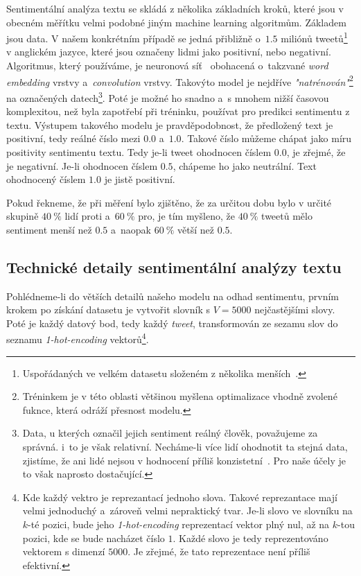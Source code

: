 \documentclass[12pt, a4paper]{article}
\numberwithin{equation}{section} 	%
\begin{document}
Sentimentální analýza textu se skládá z několika základních kroků, které jsou v obecném měřítku velmi podobné jiným machine learning algoritmům. Základem jsou data. V našem konkrétním případě se jedná přibližně o~$1.5$ miliónů tweetů\footnote{Uspořádaných ve velkém datasetu složeném z několika menších~\cite{TwitterData1, TwitterData2}.} v anglickém jazyce, které jsou označeny lidmi jako positivní, nebo negativní. Algoritmus, který používáme, je neuronová síť~\cite{TwitterSentAnalysis} obohacená o~takzvané \textit{word embedding} vrstvy a~\textit{convolution} vrstvy. Takovýto model je nejdříve \textit{"natrénován"}\footnote{Tréninkem je v této oblasti většinou myšlena optimalizace vhodně zvolené fuknce, která odráží přesnost modelu.} na označených datech\footnote{Data, u kterých označil jejich sentiment reálný člověk, považujeme za správná. i~to je však relativní. Necháme-li více lidí ohodnotit ta stejná data, zjistíme, že ani lidé nejsou v hodnocení příliš konzistetní~\cite{HumanVsMachineLearning}. Pro naše účely je to však naprosto dostačující.}. Poté je možné ho snadno a~s mnohem nižší časovou komplexitou, než byla zapotřebí při tréninku, používat pro predikci sentimentu z textu. Výstupem takového modelu je pravděpodobnost, že předložený text je positivní, tedy reálné číslo mezi $0.0$ a~$1.0$. Takové číslo můžeme chápat jako míru positivity sentimentu textu. Tedy je-li tweet ohodnocen číslem $0.0$, je zřejmé, že je negativní. Je-li ohodnocen číslem $0.5$, chápeme ho jako neutrální. Text ohodnocený číslem $1.0$ je jistě positivní.

Pokud řekneme, že při měření bylo zjištěno, že za určitou dobu bylo v určité skupině $40~\%$ lidí proti a~$60~\%$ pro, je tím myšleno, že $40~\%$ tweetů mělo sentiment menší než $0.5$ a~naopak $60~\%$ větší než $0.5$.

\subsection{Technické detaily sentimentální analýzy textu}
\noindent Pohlédneme-li do větších detailů našeho modelu na odhad sentimentu, prvním krokem po získání datasetu je vytvořit slovník s $V = 5000$ nejčastějšími slovy. Poté je každý datový bod, tedy každý \textit{tweet}, transformován ze sezamu slov do seznamu \textit{1-hot-encoding} vektorů\footnote{Kde každý vektro je reprezantací jednoho slova. Takové reprezantace mají velmi jednoduchý a~zároveň velmi nepraktický tvar. Je-li slovo ve slovníku na $k$-té pozici, bude jeho \textit{1-hot-encoding} reprezentací vektor plný nul, až na $k$-tou pozici, kde se bude nacházet číslo $1$. Každé slovo je tedy reprezentováno vektorem s dimenzí $5000$. Je zřejmé, že tato reprezentace není příliš efektivní.}.
\end{document}

